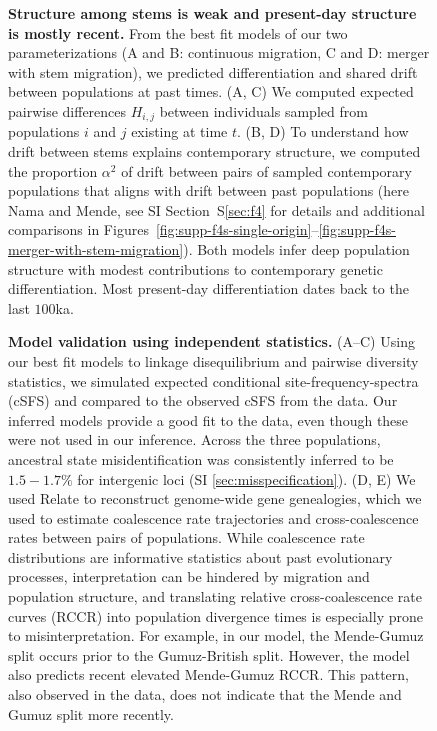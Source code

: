 \documentclass[]{article}
\begin{document}
\begin{figure}[t!]
    \centering
    \caption{
        \textbf{Structure among stems is weak and present-day structure is
        mostly recent.} From the best fit models of our two parameterizations
        (A and B: continuous migration, C and D: merger with stem migration),
        we predicted differentiation and shared drift between populations at
        past times. (A, C) We computed expected pairwise differences $H_{i,j}$
        between individuals sampled from populations $i$ and $j$ existing at
        time $t$. (B, D) To understand how drift between stems explains
        contemporary structure, we computed the proportion $\alpha^2$ of drift
        between pairs of sampled contemporary populations that aligns with
        drift between past populations (here Nama and Mende, see SI
        Section~S\ref{sec:f4} for details and additional comparisons in
        Figures~\ref{fig:supp-f4s-single-origin}--\ref{fig:supp-f4s-merger-with-stem-migration}).
        Both models infer deep population structure with modest contributions to
        contemporary genetic differentiation.  Most present-day differentiation
        dates back to the last $100$ka.
    }
    \label{fig:predictions}
\end{figure}

\begin{figure}[t!]
    \centering
    \caption{
        \textbf{Model validation using independent statistics.} (A--C) Using
        our best fit models to linkage disequilibrium and pairwise diversity statistics,
        we simulated expected conditional site-frequency-spectra (cSFS) and
        compared to the observed cSFS from the data. Our inferred models
        provide a good fit to the data, even though these were not used in our
        inference. Across the three populations, ancestral state
        misidentification was consistently inferred to be $1.5-1.7\%$ for
        intergenic loci (SI \ref{sec:misspecification}). (D, E) We used Relate
        \citep{Speidel2019-nj} to reconstruct genome-wide gene genealogies,
        which we used to estimate coalescence rate trajectories
        and cross-coalescence rates between pairs of populations. While
        coalescence rate distributions are informative statistics about past
        evolutionary processes, interpretation can be hindered by migration and
        population structure, and translating relative cross-coalescence rate
        curves (RCCR) into population divergence times is especially prone
        to misinterpretation.
        For example, in our model, the Mende-Gumuz split occurs prior to the
        Gumuz-British split. However, the model also predicts recent elevated
        Mende-Gumuz RCCR. This pattern, also observed in the data, does not
        indicate that the Mende and Gumuz split more recently.
    }
    \label{fig:validation}
\end{figure}
\end{document}
